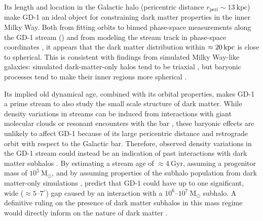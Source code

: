 \documentclass[modern]{aastex62}
\newcommand{\msun}{\textrm{M}_\odot}
\newcommand{\kpc}{\textrm{kpc}}
\begin{document}
Its length and location in the Galactic halo (pericentric distance
$r_\textrm{peri} \sim 13~\kpc$) make GD-1 an ideal object for constraining dark
matter properties in the inner Milky Way.
Both from fitting orbits to binned phase-space measurements along the GD-1
stream (\citealt{Koposov:2010}) and from modeling the stream track in
phase-space coordinates \citep{Bowden:2015, Bovy:2016}, it appears that the dark
matter distribution within $\approx20\,\rm kpc$ is close to spherical.
This is consistent with findings from simulated Milky Way-like galaxies:
simulated dark-matter-only halos tend to be triaxial \citep{Allgood:2006}, but
baryonic processes tend to make their inner regions more spherical
\citep{Zhu:2016}.

Its implied old dynamical age, combined with its orbital properties, makes GD-1
a prime stream to also study the small scale structure of dark matter.
While density variations in streams can be induced from interactions with giant
molecular clouds \citep{Amorisco:2016} or resonant encounters with the bar
\citep{Pearson:2017}, these baryonic effects are unlikely to affect GD-1 because
of its large pericentric distance and retrograde orbit with respect to the
Galactic bar.
Therefore, observed density variations in the GD-1 stream could instead be an
indication of past interactions with dark matter subhalos
\citep[e.g.,][]{Ngan:2014}.
By estimating a stream age of $\approx 4~\textrm{Gyr}$, assuming a progenitor
mass of $10^5~\msun$, and by assuming properties of the subhalo population from
dark matter-only simulations \citep[scaled to the Milky Way halo mass and
reduced in number by a factor of 3 to account for disruption by the Galactic
disk]{Springel:2008, Diemand:2008}, \citet{Erkal:2016} predict that GD-1 could
have up to one significant, wide ($\approx 5$--$7^\circ$) gap caused by an
interaction with a $10^6$--$10^7~\msun$ subhalo.
A definitive ruling on the presence of dark matter subhalos in this mass regime
would directly inform on the nature of dark matter \citep[e.g.][]{Bullock:2017}.
\end{document}
